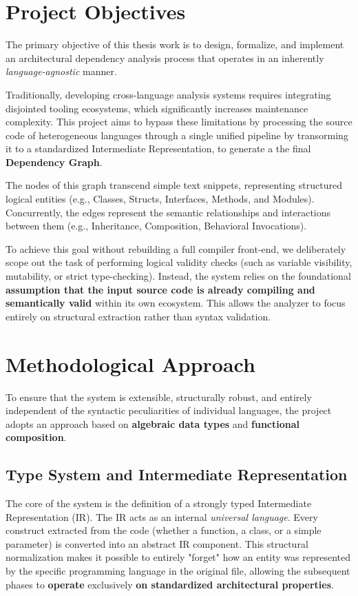 \section{Project Objectives}
The primary objective of this thesis work is to design, formalize,
and implement an architectural dependency analysis process that
operates in an inherently \textit{language-agnostic} manner.

Traditionally, developing cross-language analysis systems requires
integrating disjointed tooling ecosystems, which significantly
increases maintenance complexity. This project aims to bypass these
limitations by processing the source code of heterogeneous
languages through a single unified pipeline by transorming it to a
standardized Intermediate Representation, to generate a
the final \textbf{Dependency Graph}.

The nodes of this graph transcend simple text snippets, representing
structured logical entities (e.g., Classes, Structs, Interfaces,
Methods, and Modules). Concurrently, the edges represent the semantic
relationships and interactions between them (e.g., Inheritance,
Composition, Behavioral Invocations).

To achieve this goal without rebuilding a full compiler front-end, we
deliberately scope out the task of performing logical validity checks
(such as variable visibility, mutability, or strict type-checking).
Instead, the system relies on the foundational \textbf{assumption
  that the input source code is already compiling and semantically
valid} within its own ecosystem. This allows the analyzer to focus
entirely on structural extraction rather than syntax validation.

\section{Methodological Approach}
To ensure that the system is extensible, structurally robust, and
entirely independent of the syntactic peculiarities of individual
languages, the project adopts an approach based on
\textbf{algebraic data types} \cite{pierce_types_2002} and
\textbf{functional composition}.

\subsection{Type System and Intermediate Representation}
The core of the system is the definition of a strongly typed
Intermediate Representation (IR). The IR acts as an internal
\textit{universal language}. Every construct extracted from the
code (whether a function, a class, or a simple parameter) is converted
into an abstract IR component. This structural normalization makes it
possible to entirely "forget" how an entity was represented by the
specific programming language in the original file, allowing the
subsequent phases to \textbf{operate} exclusively \textbf{on standardized
architectural properties}.

